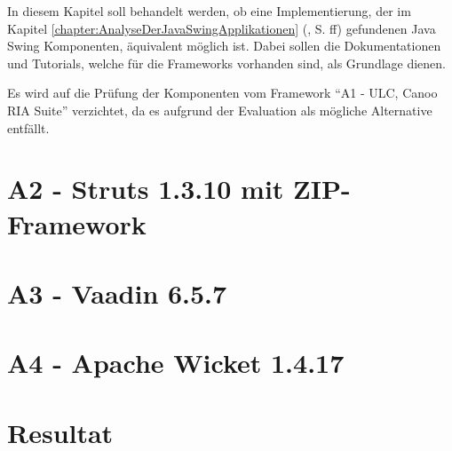 In diesem Kapitel soll behandelt werden, ob eine Implementierung, der im Kapitel 
\ref{chapter:AnalyseDerJavaSwingApplikationen}
(, S.
\pageref{chapter:AnalyseDerJavaSwingApplikationen}ff) gefundenen Java Swing
Komponenten, äquivalent möglich ist. Dabei sollen die Dokumentationen und
Tutorials, welche für die Frameworks vorhanden sind, als Grundlage dienen.

Es wird auf die Prüfung der Komponenten vom Framework ``A1 - ULC, Canoo RIA
Suite'' verzichtet, da es aufgrund der Evaluation als mögliche Alternative
entfällt.

\section{A2 - Struts 1.3.10 mit ZIP-Framework}

\section{A3 - Vaadin 6.5.7}

\section{A4 - Apache Wicket 1.4.17}

\section{Resultat}